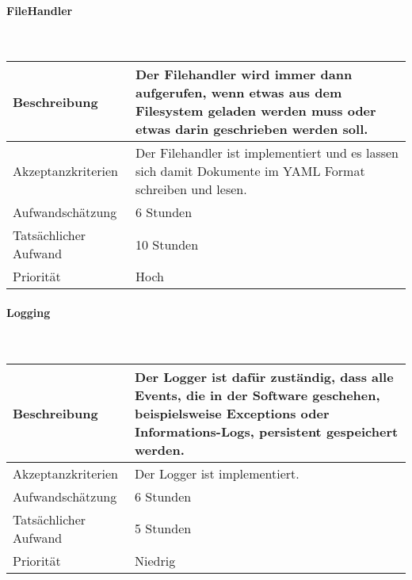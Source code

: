 \documentclass[]{subfiles}
\begin{document}
        \paragraph*{FileHandler}\mbox{} \\
        \begin{tabularx}{\textwidth}{lX}
            \toprule
            Beschreibung & Der Filehandler wird immer dann aufgerufen, wenn etwas aus dem Filesystem geladen werden muss oder etwas darin geschrieben werden soll.\\
            \midrule
            Akzeptanzkriterien & Der Filehandler ist implementiert und es lassen sich damit Dokumente im YAML Format schreiben und lesen.\\
            \midrule
            Aufwandschätzung & 6 Stunden\\
            Tatsächlicher Aufwand & 10 Stunden\\ 
            \midrule
            Priorität & Hoch\\
            \bottomrule
        \end{tabularx}
    
        \paragraph*{Logging}\mbox{} \\
        \begin{tabularx}{\textwidth}{lX}
            \toprule
            Beschreibung & Der Logger ist dafür zuständig, dass alle Events, die in der Software geschehen, beispielsweise Exceptions oder Informations-Logs, persistent gespeichert werden.\\
            \midrule
            Akzeptanzkriterien & Der Logger ist implementiert.\\
            \midrule
            Aufwandschätzung & 6 Stunden\\
            Tatsächlicher Aufwand & 5 Stunden\\ 
            \midrule
            Priorität & Niedrig\\
            \bottomrule
        \end{tabularx}
    
\end{document}
